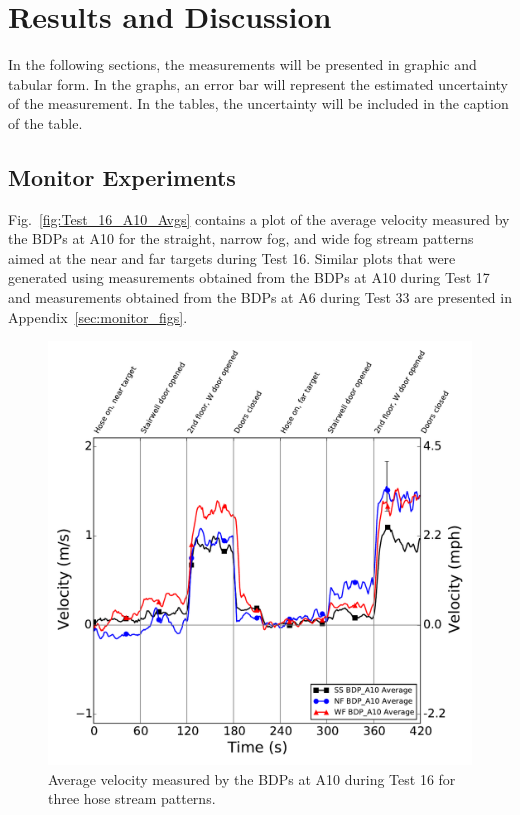 \documentclass[12pt,oneside]{book}
\begin{document}

\chapter{Results and Discussion}
\label{chap:results}
In the following sections, the measurements will be presented in graphic and tabular form. In the graphs, an error bar will represent the estimated uncertainty of the measurement. In the tables, the uncertainty will be included in the caption of the table.

\section{Monitor Experiments}
\label{sec:monitor_results}

Fig.~\ref{fig:Test_16_A10_Avgs} contains a plot of the average velocity measured by the BDPs at A10 for the straight, narrow fog, and wide fog stream patterns aimed at the near and far targets during Test 16. Similar plots that were generated using measurements obtained from the BDPs at A10 during Test 17 and measurements obtained from the BDPs at A6 during Test 33 are presented in Appendix~\ref{sec:monitor_figs}.

\begin{figure}[!ht]
	\includegraphics[width=6in]{../Figures/Plots/Test_16_West_063014_BDP_A10_stream_avgs}
	\caption{Average velocity measured by the BDPs at A10 during Test 16 for three hose stream patterns.}
	\label{fig:Test_16_BDP_A10_Avg_All}
\end{figure}
\FloatBarrier
\end{document}
